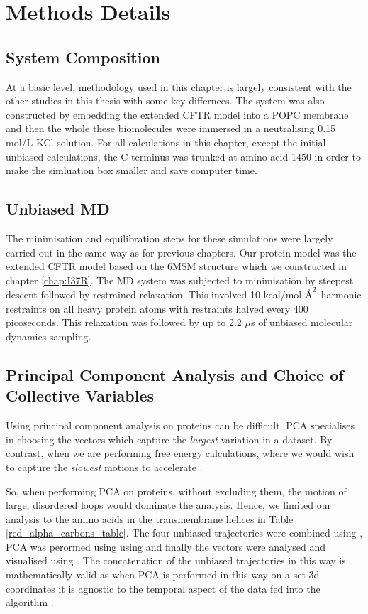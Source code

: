 \section{Methods Details}
\subsection{System Composition}
At a basic level, methodology used in this chapter is largely consistent with the other studies in this thesis with some key differnces. The system was also constructed by embedding the extended CFTR model into a POPC membrane and then the whole these biomolecules were immersed in a neutralising 0.15 mol/L KCl solution. For all calculations in this chapter, except the initial unbiased calculations, the C-terminus was trunked at amino acid 1450 in order to make the simluation box smaller and save computer time.

\subsection{Unbiased MD }
The minimisation and equilibration steps for these simulations were largely carried out in the same way as for previous chapters. Our protein model was the extended CFTR model based on the 6MSM structure \cite{zhang2018} which we constructed in chapter \ref{chap:I37R}. The MD system was subjected to minimisation by steepest descent followed by restrained relaxation. This involved 10 kcal/mol $\textup{\AA}^2$ harmonic restraints on all heavy protein atoms with restraints halved every 400 picoseconds. This relaxation was followed by up to 2.2 $\mu$s of unbiased molecular dynamics sampling.

\subsection {Principal Component Analysis and Choice of Collective Variables}
\label {supp_cv_choice}
Using principal component analysis on proteins can be difficult. PCA specialises in choosing the vectors which capture the \textit{largest} variation in a dataset. By contrast, when we are performing free energy calculations, where we would wish to capture the \textit{slowest} motions to accelerate \cite{noe2001}. 

So, when performing PCA on proteins, without excluding them, the motion of large, disordered loops would dominate the analysis. Hence, we limited our analysis to the amino acids in the transmembrane helices in Table \ref{red_alpha_carbons_table}. The four unbiased trajectories were combined using , PCA was perormed using using  and finally the vectors were analysed and visualised using . The concatenation of the unbiased trajectories in this way is mathematically valid as when PCA is performed in this way on a set 3d coordinates it is agnostic to the temporal aspect of the data fed into the algorithm \cite{}.

